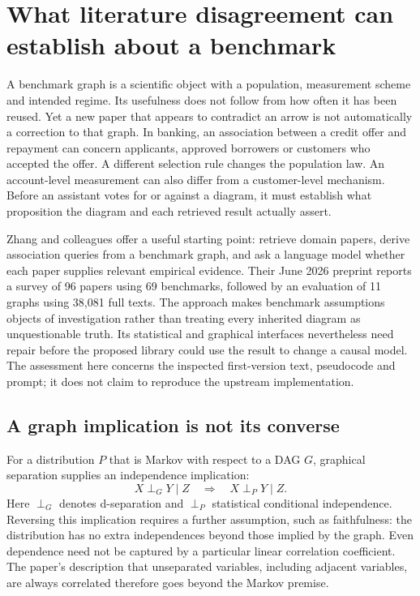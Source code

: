 \section{What literature disagreement can establish about a benchmark}
\label{exec17:validity-development}

A benchmark graph is a scientific object with a population, measurement scheme
and intended regime. Its usefulness does not follow from how often it has been
reused. Yet a new paper that appears to contradict an arrow is not automatically
a correction to that graph. In banking, an association between a credit offer
and repayment can concern applicants, approved borrowers or customers who
accepted the offer. A different selection rule changes the population law.
An account-level measurement can also differ from a customer-level mechanism.
Before an assistant votes for or against a diagram, it must establish what
proposition the diagram and each retrieved result actually assert.

Zhang and colleagues offer a useful starting point: retrieve domain papers,
derive association queries from a benchmark graph, and ask a language model
whether each paper supplies relevant empirical evidence. Their June 2026
preprint reports a survey of 96 papers using 69 benchmarks, followed by an
evaluation of 11 graphs using 38,081 full texts. The approach makes benchmark
assumptions objects of investigation rather than treating every inherited
diagram as unquestionable truth. Its statistical and graphical interfaces
nevertheless need repair before the proposed library could use the result to
change a causal model. The assessment here concerns the inspected first-version
text, pseudocode and prompt; it does not claim to reproduce the upstream
implementation.~\citep{exec17_benchmark_consistency}

\subsection{A graph implication is not its converse}

For a distribution $P$ that is Markov with respect to a DAG $G$, graphical
separation supplies an independence implication:
\begin{equation}
 X\perp_G Y\mid Z \quad\Longrightarrow\quad X\perp_P Y\mid Z.
\label{exec17:validity-markov}
\end{equation}
Here $\perp_G$ denotes d-separation and $\perp_P$ statistical conditional
independence. Reversing this implication requires a further assumption, such
as faithfulness: the distribution has no extra independences beyond those
implied by the graph. Even dependence need not be captured by a particular
linear correlation coefficient. The paper's description that unseparated
variables, including adjacent variables, are always correlated therefore goes
beyond the Markov premise.~\citep{exec17_benchmark_consistency}

